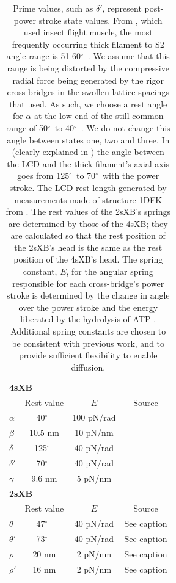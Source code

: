\documentclass[]{article}
\newcommand{\de}{$^\circ$~} %
\begin{document}
\begin{table}[ft]
    \begin{center}
    \begin{tabular}[t]{|l|ccc|} \hline
    \multicolumn{4}{|l|}{\textbf{4sXB}} \\ 
    \multicolumn{1}{|l}{~} 
              & Rest value & $E$        & Source \\ \cline{2-4}  
    $\alpha$  & 40\de      & 100 pN/rad & \citet{Liu2006}      \\
    $\beta$   & 10.5 nm    & 10 pN/nm   & \citet{Liu2006}      \\
    $\delta$  & 125\de     & 40 pN/rad  & \citet{Taylor1999}   \\
    $\delta'$ & 70\de      & 40 pN/rad  & \citet{Taylor1999}   \\
    $\gamma$  & 9.6 nm     & 5 pN/nm    & \citet{Houdusse2000} \\ \hline
    \multicolumn{4}{|l|}{\textbf{2sXB}} \\ 
    \multicolumn{1}{|l}{~} 
              & Rest value & $E$        & Source      \\ \cline{2-4} 
    $\theta$  & 47\de      & 40 pN/rad  & See caption \\
    $\theta'$ & 73\de      & 40 pN/rad  & See caption \\
    $\rho$    & 20 nm      & 2 pN/nm    & See caption \\
    $\rho'$   & 16 nm      & 2 pN/nm    & See caption \\ \hline
    \end{tabular}
    \end{center}
    \caption{ 
    \label{parameter_table}
    Prime values, such as $\delta'$, represent post-power stroke state values. 
    From \citet{Liu2006}, which used insect flight muscle, the most frequently occurring thick filament to S2 angle range is 51-60\de. 
    We assume that this range is being distorted by the compressive radial force being generated by the rigor cross-bridges in the swollen lattice spacings that \citet{Liu2006} used. 
    As such, we choose a rest angle for $\alpha$ at the low end of the still common range of 50\de to 40\de. 
    We do not change this angle between states one, two and three.
    In \citet{Taylor1999} (clearly explained in \citet{Davis2009}) the angle between the LCD and the thick filament's axial axis goes from 125\de to 70\de with the power stroke. 
    The LCD rest length generated by measurements made of structure 1DFK from \citet{Houdusse2000}. 
    The rest values of the 2sXB's springs are determined by those of the 4sXB; they are calculated so that the rest position of the 2sXB's head is the same as the rest position of the 4sXB's head. 
    The spring constant, $E$, for the angular spring responsible for each cross-bridge's power stroke is determined by the change in angle over the power stroke and the energy liberated by the hydrolysis of ATP \citep{Tanner2007}. 
    Additional spring constants are chosen to be consistent with previous work, and to provide sufficient flexibility to enable diffusion. 
    }
\end{table}
\end{document}
